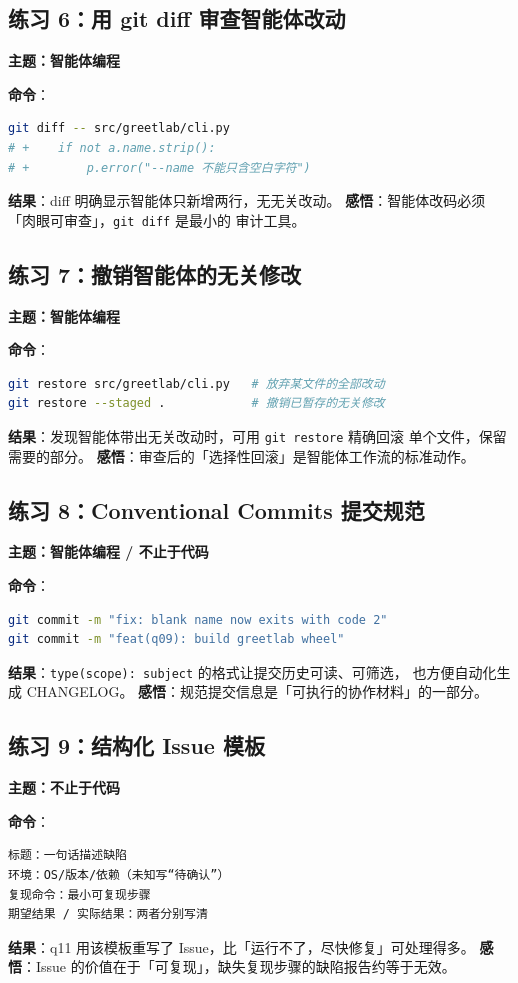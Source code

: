 \documentclass{hamesome-report}
\begin{document}
\subsection{练习 6：用 git diff 审查智能体改动}
\textbf{主题：智能体编程}\par
\textbf{命令}：
\begin{lstlisting}[language=bash]
git diff -- src/greetlab/cli.py
# +    if not a.name.strip():
# +        p.error("--name 不能只含空白字符")
\end{lstlisting}
\textbf{结果}：diff 明确显示智能体只新增两行，无无关改动。
\textbf{感悟}：智能体改码必须「肉眼可审查」，\texttt{git diff} 是最小的
审计工具。

\subsection{练习 7：撤销智能体的无关修改}
\textbf{主题：智能体编程}\par
\textbf{命令}：
\begin{lstlisting}[language=bash]
git restore src/greetlab/cli.py   # 放弃某文件的全部改动
git restore --staged .            # 撤销已暂存的无关修改
\end{lstlisting}
\textbf{结果}：发现智能体带出无关改动时，可用 \texttt{git restore} 精确回滚
单个文件，保留需要的部分。
\textbf{感悟}：审查后的「选择性回滚」是智能体工作流的标准动作。

\subsection{练习 8：Conventional Commits 提交规范}
\textbf{主题：智能体编程 / 不止于代码}\par
\textbf{命令}：
\begin{lstlisting}[language=bash]
git commit -m "fix: blank name now exits with code 2"
git commit -m "feat(q09): build greetlab wheel"
\end{lstlisting}
\textbf{结果}：\texttt{type(scope): subject} 的格式让提交历史可读、可筛选，
也方便自动化生成 CHANGELOG。
\textbf{感悟}：规范提交信息是「可执行的协作材料」的一部分。

\subsection{练习 9：结构化 Issue 模板}
\textbf{主题：不止于代码}\par
\textbf{命令}：
\begin{lstlisting}[language={}]
标题：一句话描述缺陷
环境：OS/版本/依赖（未知写“待确认”）
复现命令：最小可复现步骤
期望结果 / 实际结果：两者分别写清
\end{lstlisting}
\textbf{结果}：q11 用该模板重写了 Issue，比「运行不了，尽快修复」可处理得多。
\textbf{感悟}：Issue 的价值在于「可复现」，缺失复现步骤的缺陷报告约等于无效。
\end{document}
